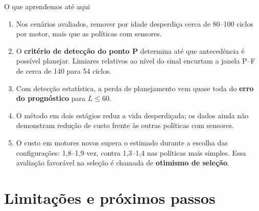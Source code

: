 \documentclass[aspectratio=169,10pt]{beamer}
\begin{document}
\begin{frame}{O que aprendemos até aqui}
  \begin{enumerate}
    \item Nos cenários avaliados, remover por idade desperdiça cerca de 80–100 ciclos por motor, mais que as políticas com sensores.
    \item O \textbf{critério de detecção do ponto P} determina até que antecedência é possível planejar. Limiares relativos ao nível do sinal encurtam a janela P--F de cerca de 140 para 54 ciclos.
    \item Com detecção estatística, a perda de planejamento vem quase toda do \textbf{erro do prognóstico} para $L \leq 60$.
    \item O método em dois estágios reduz a vida desperdiçada; os dados ainda não demonstram redução de custo frente às outras políticas com sensores.
    \item O custo em motores novos supera o estimado durante a escolha das configurações: 1,8--1,9 vez, contra 1,3--1,4 nas políticas mais simples. Essa avaliação favorável na seleção é chamada de \textbf{otimismo de seleção}.
  \end{enumerate}
\end{frame}

\section{Limitações e próximos passos}
\end{document}
